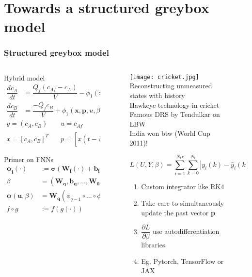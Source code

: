 \documentclass[dvipsnames, 9pt]{beamer}
\begin{document}
\section{Towards a structured greybox model}
\begin{frame}
    \frametitle{Structured greybox model}
    
    \begin{columns}
    {   \begin{column}{0.57\textwidth}
        \begin{block}{Hybrid model}
\begin{align*}
\dfrac{dc_A}{dt} &= \dfrac{Q_f (c_{Af} - c_A)}{V} - \phi_1 (\mathbf{x, p}, u,\beta) \\
\dfrac{dc_B}{dt} &= \dfrac{-Q_f c_B}{V} + \phi_1 (\mathbf{x, p}, u,\beta) - 3 \phi_2 (\mathbf{x, p}, u,\beta) 
\end{align*}
\begin{align*}
y = (c_A, c_B) &\quad u = c_{Af} \\
x = [c_A, c_B]^T &\quad p = [x(t - N_p \Delta)^T, \ldots , x(t - \Delta)^T]^T 
\end{align*}
\end{block}
\begin{block}{Primer on FNNs}
\begin{align*}
\boldsymbol{\phi_i}(\cdot) &:= \boldsymbol{\sigma}(\mathbf{W_i}(\cdot) + \mathbf{b_i}) \\
\beta &= (\mathbf{W_q, b_q, \ldots, W_0, b_0}) \\
\boldsymbol{\phi}(\mathbf{u}, \beta) &= \mathbf{W_q} (\phi_{q-1} \circ \ldots \circ \phi_0(\mathbf{u})) + \mathbf{b_q} \\
f \circ g &:= f(g(\cdot))
\end{align*}
\end{block}
        \end{column}}
        \begin{column}{0.4\textwidth}
            \begin{figure}
\texttt{[image: cricket.jpg]}
\scriptsize{Reconstructing unmeasured states with history \\ Hawkeye technology in cricket \\ Famous DRS by Tendulkar on LBW \\ India won btw (World Cup 2011)!}
\newline
\begin{alertblock}{}
\begin{equation*}
L(U,Y,\beta) = \sum_{i=1}^{N_tr} \sum_{k=0}^{N_t} |y_i(k) - \hat{y}_i (k)|^2
\end{equation*}
\begin{enumerate}
\scriptsize
\item Custom integrator like RK4
\item Take care to simultaneously update the past vector \textbf{p}
\item $\dfrac{\partial L}{\partial \beta}$ use autodifferentiation libraries
\item Eg. Pytorch, TensorFlow or JAX
\end{enumerate}
\end{alertblock}


\end{figure}
\end{column}
\end{columns}
\end{frame}
\end{document}
